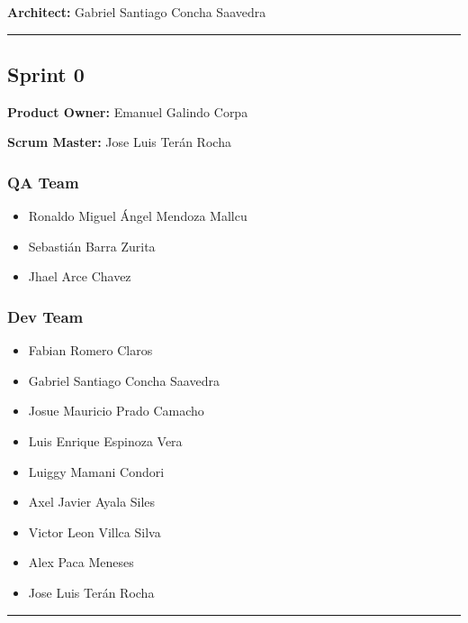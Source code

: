 \documentclass{article}
\providecommand{\tightlist}{
  \setlength{\itemsep}{0pt}\setlength{\parskip}{0pt}}
\begin{document}
\textbf{Architect:}
Gabriel Santiago Concha Saavedra

\begin{center}\rule{0.5\linewidth}{0.5pt}\end{center}

\hypertarget{sprint0}{
\subsection{Sprint 0}\label{sprint0}}

\textbf{Product Owner:}
Emanuel Galindo Corpa 

\textbf{Scrum Master: }
Jose Luis Terán Rocha

\hypertarget{qateam}{
\subsubsection{QA Team}\label{qateam-0}}

\begin{itemize}
\tightlist
\item
  Ronaldo Miguel Ángel Mendoza Mallcu
\item
  Sebastián Barra Zurita
\item
  Jhael Arce Chavez
\end{itemize}

\hypertarget{devteam}{
\subsubsection{Dev Team}\label{devteam-0}}

\begin{itemize}
\tightlist
\item
  Fabian Romero Claros
\item
  Gabriel Santiago Concha Saavedra
\item
  Josue Mauricio Prado Camacho
\item
  Luis Enrique Espinoza Vera
\item
  Luiggy Mamani Condori
\item
  Axel Javier Ayala Siles
\item
  Victor Leon Villca Silva
\item
  Alex Paca Meneses
\item
  Jose Luis Terán Rocha
\end{itemize}

\begin{center}\rule{0.5\linewidth}{0.5pt}\end{center}
\end{document}
